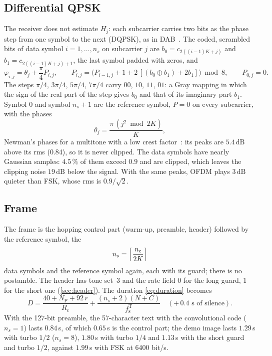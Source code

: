 \documentclass[11pt,a4paper]{article}
\newcommand{\dB}{\,\mathrm{dB}}
\newcommand{\fsT}{f_{\mathrm{s}}^{\mathrm{T}}}
\newcommand{\Rc}{R_{\mathrm{c}}}
\newcommand{\NP}{N_{\mathrm{P}}}
\newcommand{\nc}{n_{\mathrm{c}}}
\theoremstyle{remark}
\begin{document}
\subsection{Differential QPSK}
\label{sec:dqpsk}
The receiver does not estimate $H_j$: each subcarrier carries two bits as the phase step from one symbol to the next (DQPSK), as in DAB~\cite{dab}. The coded, scrambled bits of data symbol $i = 1, \dots, n_s$ on subcarrier $j$ are $b_0 = c_{2((i-1)K + j)}$ and $b_1 = c_{2((i-1)K + j) + 1}$, the last symbol padded with zeros, and
\begin{equation}
\varphi_{i,j} = \theta_j + \frac{\pi}{4} P_{i,j}, \qquad P_{i,j} = \bigl(P_{i-1,j} + 1 + 2\,[(b_0 \oplus b_1) + 2 b_1]\bigr) \bmod 8, \qquad P_{0,j} = 0.
\label{eq:dqpsk}
\end{equation}
The steps $\pi/4$, $3\pi/4$, $5\pi/4$, $7\pi/4$ carry $00$, $10$, $11$, $01$: a Gray mapping in which the sign of the real part of the step gives $b_0$ and that of its imaginary part $b_1$. Symbol $0$ and symbol $n_s + 1$ are the reference symbol, $P = 0$ on every subcarrier, with the phases
\begin{equation}
\theta_j = \frac{\pi\,(j^2 \bmod 2K)}{K},
\end{equation}
Newman's phases for a multitone with a low crest factor~\cite{boyd}: its peaks are $5.4\dB$ above its rms (0.84), so it is never clipped. The data symbols have nearly Gaussian samples: $4.5\,\%$ of them exceed $0.9$ and are clipped, which leaves the clipping noise $19\dB$ below the signal. With the same peaks, OFDM plays $3\dB$ quieter than FSK, whose rms is $0.9/\sqrt2$.

\subsection{Frame}
The frame is the hopping control part (warm-up, preamble, header) followed by the reference symbol, the
\begin{equation}
n_s = \Bigl\lceil \frac{\nc}{2K} \Bigr\rceil
\end{equation}
data symbols and the reference symbol again, each with its guard; there is no postamble. The header has tone set~3 and the rate field 0 for the long guard, 1 for the short one (\cref{sec:header}). The duration \cref{eq:duration} becomes
\begin{equation}
D = \frac{40 + \NP + 92\,r}{\Rc} + \frac{(n_s + 2)(N + C)}{\fsT} \quad (+\,0.4\text{ s of silence}).
\end{equation}
With the 127-bit preamble, the 57-character text with the convolutional code ($n_s = 1$) lasts $0.84$\,s, of which $0.65$\,s is the control part; the demo image lasts $1.29$\,s with turbo $1/2$ ($n_s = 8$), $1.80$\,s with turbo $1/4$ and $1.13$\,s with the short guard and turbo $1/2$, against $1.99$\,s with FSK at 6400 bit/s.
\end{document}

